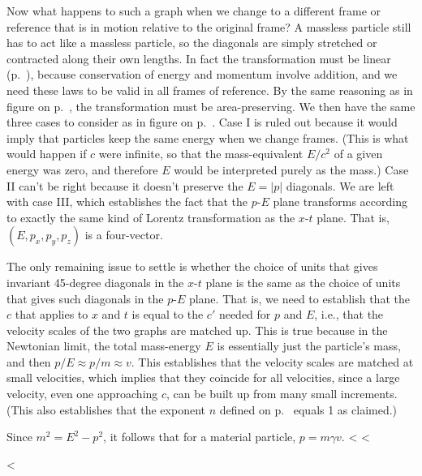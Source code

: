 Now what happens to such a graph when we change to a different frame or reference that is in motion relative to the
original frame? A massless particle still has to act like a massless particle, so the diagonals are simply stretched
or contracted along their own lengths.
In fact the transformation must be linear (p.~\pageref{fig:nonlinear-transformation}), because conservation of
energy and momentum involve addition, and we need these laws to be valid in all frames of reference.
By the same reasoning as in figure  on p.~\pageref{fig:area-proof}, the transformation must be area-preserving.
We then have the same three cases to consider as in figure  on p.~\pageref{fig:three-cases}.
Case I is ruled out because it would imply that particles keep the same energy when we change frames.
(This is what would happen if $c$ were infinite, so that the mass-equivalent $E/c^2$ of a given energy was zero,
and therefore $E$ would be interpreted purely as the mass.) Case II can't be right because it doesn't preserve
the $E=|p|$ diagonals. We are left with case III, which establishes the fact that
the $p$-$E$ plane transforms according to exactly the same kind of Lorentz transformation as the $x$-$t$ plane.
That is, $(E,p_x,p_y,p_z)$ is a four-vector.

The only remaining issue to settle is whether the choice of units that gives invariant 45-degree diagonals in the
$x$-$t$ plane is the same as the choice of units that gives such diagonals in the $p$-$E$ plane.
That is, we need to establish that the $c$ that applies to $x$ and $t$ is equal to the $c'$ needed for $p$ and $E$,
i.e., that the velocity scales of the two graphs are matched up.
This is true because in the Newtonian limit, the total mass-energy $E$ is essentially just the particle's mass,
and then $p/E \approx p/m \approx v$. This establishes that the velocity scales are matched at small velocities,
which implies that they coincide for all velocities, since a large velocity, even one approaching $c$,
can be built up from many small increments. (This also establishes that the exponent $n$ defined on p.~\pageref{pesky-exponent-claim}
equals 1 as claimed.)\label{pesky-exponent-proof}

Since $m^2=E^2-p^2$, it follows that for a material particle, $p=m\gamma v$.
\vfill
<%
<%

<%

